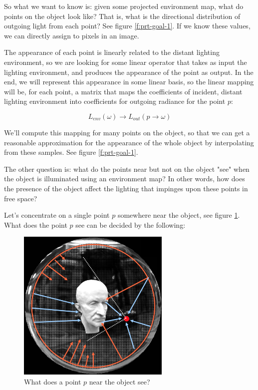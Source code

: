 So what we want to know is: given some projected environment map, what do points on the object look like? That is, what is the directional distribution of outgoing light from each point? See figure \ref{f:prt-goal-1}. If we know these values, we can directly assign to pixels in an image.

The appearance of each point is linearly related to the distant lighting environment, so we are looking for some linear operator that takes as input the lighting environment, and produces the appearance of the point as output. In the end, we will represent this appearance in some linear basis, so the linear mapping will be, for each point, a matrix that maps the coefficients of incident, distant lighting environment into coefficients for outgoing radiance for the point $p$:

\begin{equation*}
	L_{env}(\omega)\to L_{out}(p\to\omega)
\end{equation*}

We'll compute this mapping for many points on the object, so that we can get a reasonable approximation for the appearance of the whole object by interpolating from these samples. See figure \ref{f:prt-goal-1}.

The other question is: what do the points near but not on the object "see" when the object is illuminated using an environment map? In other words, how does the presence of the object affect the lighting that impinges upon these points in free space?

Let's concentrate on a single point $p$ somewhere near the object, see figure \ref{f:prt-goal-2}. What does the point $p$ see can be decided by the following:

\begin{figure}
\sidecaption
	\includegraphics[width=0.65\textwidth]{graphics/prt/prt-8-2}
	\caption{What does a point $p$ near the object see?}
	\label{f:prt-goal-2}
\end{figure}

